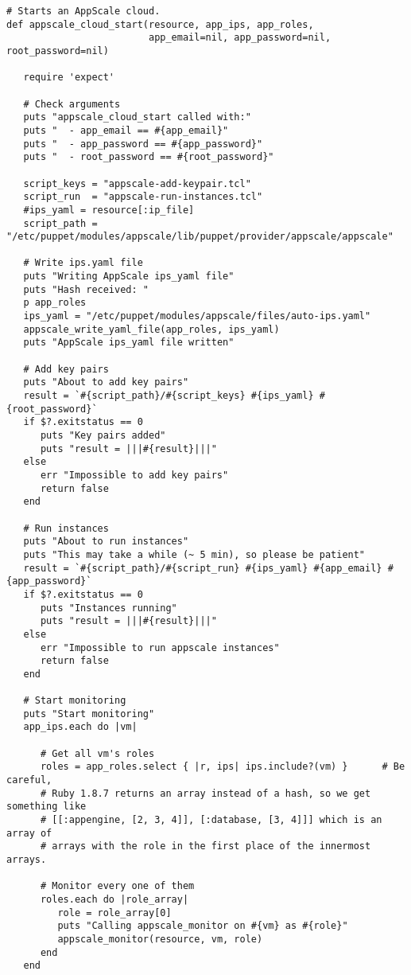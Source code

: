 \begin{lstlisting}
# Starts an AppScale cloud.
def appscale_cloud_start(resource, app_ips, app_roles,
                         app_email=nil, app_password=nil, root_password=nil)

   require 'expect'
   
   # Check arguments
   puts "appscale_cloud_start called with:"
   puts "  - app_email == #{app_email}"
   puts "  - app_password == #{app_password}"
   puts "  - root_password == #{root_password}"
   
   script_keys = "appscale-add-keypair.tcl"
   script_run  = "appscale-run-instances.tcl"
   #ips_yaml = resource[:ip_file]
   script_path = "/etc/puppet/modules/appscale/lib/puppet/provider/appscale/appscale"

   # Write ips.yaml file
   puts "Writing AppScale ips_yaml file"
   puts "Hash received: "
   p app_roles
   ips_yaml = "/etc/puppet/modules/appscale/files/auto-ips.yaml"
   appscale_write_yaml_file(app_roles, ips_yaml)
   puts "AppScale ips_yaml file written"

   # Add key pairs
   puts "About to add key pairs"
   result = `#{script_path}/#{script_keys} #{ips_yaml} #{root_password}`
   if $?.exitstatus == 0
      puts "Key pairs added"
      puts "result = |||#{result}|||"
   else
      err "Impossible to add key pairs"
      return false
   end
   
   # Run instances
   puts "About to run instances"
   puts "This may take a while (~ 5 min), so please be patient"
   result = `#{script_path}/#{script_run} #{ips_yaml} #{app_email} #{app_password}`
   if $?.exitstatus == 0
      puts "Instances running"
      puts "result = |||#{result}|||"
   else
      err "Impossible to run appscale instances"
      return false
   end
   
   # Start monitoring
   puts "Start monitoring"
   app_ips.each do |vm|

      # Get all vm's roles
      roles = app_roles.select { |r, ips| ips.include?(vm) }      # Be careful,
      # Ruby 1.8.7 returns an array instead of a hash, so we get something like
      # [[:appengine, [2, 3, 4]], [:database, [3, 4]]] which is an array of
      # arrays with the role in the first place of the innermost arrays.
      
      # Monitor every one of them
      roles.each do |role_array|
         role = role_array[0]
         puts "Calling appscale_monitor on #{vm} as #{role}"
         appscale_monitor(resource, vm, role)
      end
   end


\end{lstlisting}
